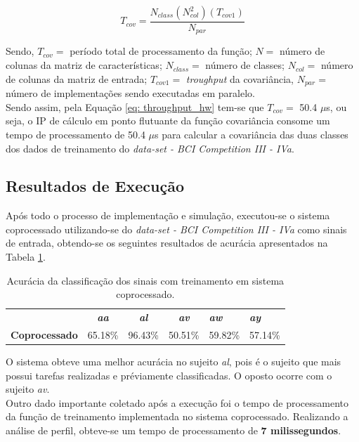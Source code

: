 \begin{equation}
\label{eq: throughput_hw}
T_{cov} = \frac{N_{class}(N_{col}^2)(T_{cov1})}{N_{par}} 
\end{equation}

Sendo, $T_{cov} =$ período total de processamento da função; $N =$ número de colunas da matriz de características; $N_{class} =$ número de classes; $N_{col} =$ número de colunas da matriz de entrada; $T_{cov1} =$ \textit{troughput} da covariância, $N_{par} =$ número de implementações sendo executadas em paralelo.\\
Sendo assim, pela Equação \ref{eq: throughput_hw} tem-se que $T_{cov} =$ 50.4 $\mu$s, ou seja, o IP de cálculo em ponto flutuante da função covariância consome um tempo de processamento de 50.4 $\mu$s para calcular a covariância das duas classes dos dados de treinamento do \textit{data-set - BCI Competition III - IVa}.
\subsection{Resultados de Execução}
Após todo o processo de implementação e simulação, executou-se o sistema coprocessado utilizando-se do \textit{data-set - BCI Competition III - IVa}
como sinais de entrada, obtendo-se os seguintes resultados de acurácia apresentados na Tabela \ref{resacc}.


\begin{table}[!h]
	\centering
	\caption{Acurácia da classificação dos sinais com treinamento em sistema coprocessado.}
	\label{resacc}
	
	\begin{tabular}{lcccll}
		\rowcolor[HTML]{DAE8FC} 
		\multicolumn{1}{c}{\cellcolor[HTML]{DAE8FC}\textbf{Sistema}} & \textit{\textbf{aa}}        & \textit{\textbf{al}}        & \textit{\textbf{av}}        & \textit{\textbf{aw}} & \textit{\textbf{ay}} \\
		\textbf{Coprocessado}                                        & \multicolumn{1}{r}{65.18\%} & \multicolumn{1}{r}{96.43\%} & \multicolumn{1}{r}{50.51\%} & 59.82\%              & 57.14\%             
	\end{tabular}
\end{table}
O sistema obteve uma melhor acurácia no sujeito \textit{al}, pois é o sujeito que mais possui tarefas realizadas e préviamente classificadas. O oposto ocorre com o sujeito \textit{av}.\\
Outro dado importante coletado após a execução foi o tempo de processamento da função de treinamento implementada no sistema coprocessado. Realizando a análise de perfil, obteve-se um tempo de processamento de \textbf{7 milissegundos}.

